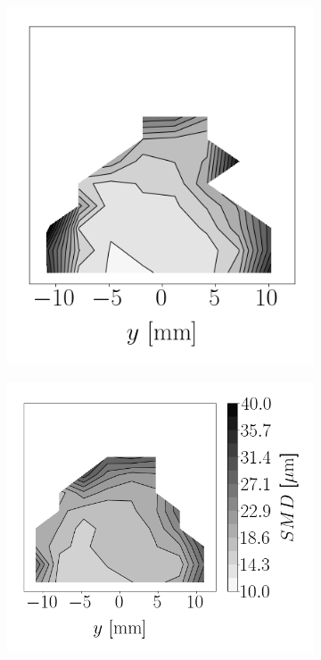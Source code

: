\begin{figure}[t!]
\begin{subfigure}[b]{0.2\textwidth}
\end{subfigure}
\hspace*{0.02in}
\begin{subfigure}[b]{0.2\textwidth}
	\flushleft
   \includegraphics[scale=0.4]{./part2_developments/figures_ch6_lagrangian_JICF/params_breakup_model/maps/TAB_SMD}
\end{subfigure}
\hspace*{0.02in}
\begin{subfigure}[b]{0.2\textwidth}
	\flushleft
   \includegraphics[scale=0.4]{./part2_developments/figures_ch6_lagrangian_JICF/params_breakup_model/maps/ETAB_SMD}
\end{subfigure}




\end{figure}
